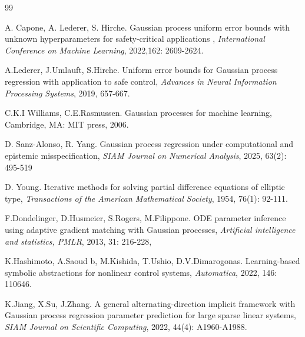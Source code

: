 \documentclass[preprint,review,sort&compress,3p]{elsarticle}
\begin{document}
\begin{thebibliography}{99}

A. Capone, A. Lederer, S. Hirche.
Gaussian process uniform error bounds with unknown hyperparameters for safety-critical applications{ ,}
{\it International Conference on Machine Learning}, 
2022,162: 2609-2624.

A.Lederer, J.Umlauft, S.Hirche.
Uniform error bounds for Gaussian process regression with application to safe control,
{\it Advances in Neural Information Processing Systems},
2019, 657-667.

C.K.I Williams, C.E.Rasmussen.
Gaussian processes for machine learning, Cambridge, MA: MIT press, 2006.


D. Sanz-Alonso, R. Yang. 
Gaussian process regression under computational and epistemic misspecification, 
{\it SIAM Journal on Numerical Analysis}, 2025, 63(2): 495-519

{  
D. Young. 
Iterative methods for solving partial difference equations of elliptic type,
{\it Transactions of the American Mathematical Society}, 
1954, 76(1): 92-111.}


F.Dondelinger, D.Husmeier, S.Rogers, M.Filippone.
ODE parameter inference using adaptive gradient matching with Gaussian processes,
{\it Artificial intelligence and statistics, PMLR},
2013, 31: 216-228, 


K.Hashimoto, A.Saoud b, M.Kishida, T.Ushio, D.V.Dimarogonas.
Learning-based symbolic abstractions for nonlinear control systems, 
{\it Automatica}, 
2022, 146: 110646.

K.Jiang, X.Su, J.Zhang.
A general alternating-direction implicit framework with Gaussian process regression parameter prediction for large sparse linear systems,
{\it SIAM Journal on Scientific Computing}, 
2022, 44(4): A1960-A1988.



\end{thebibliography}
\end{document}
